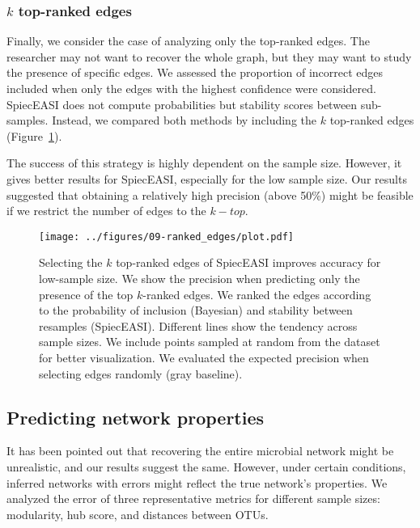 \documentclass[
  a4paper,
]{article}
\begin{document}
\hypertarget{k-top-ranked-edges}{%
\subsubsection{\texorpdfstring{\(k\) top-ranked
edges}{k top-ranked edges}}\label{k-top-ranked-edges}}

Finally, we consider the case of analyzing only the top-ranked edges.
The researcher may not want to recover the whole graph, but they may
want to study the presence of specific edges. We assessed the proportion
of incorrect edges included when only the edges with the highest
confidence were considered. SpiecEASI does not compute probabilities but
stability scores between sub-samples. Instead, we compared both methods
by including the \(k\) top-ranked edges (Figure~\ref{fig-ranked}).

The success of this strategy is highly dependent on the sample size.
However, it gives better results for SpiecEASI, especially for the low
sample size. Our results suggested that obtaining a relatively high
precision (above 50\%) might be feasible if we restrict the number of
edges to the \(k-top\).

\begin{figure}

{\centering \texttt{[image: ../figures/09-ranked\_edges/plot.pdf]}

}

\caption{\label{fig-ranked}Selecting the \(k\) top-ranked edges of
SpiecEASI improves accuracy for low-sample size. We show the precision
when predicting only the presence of the top \(k\)-ranked edges. We
ranked the edges according to the probability of inclusion (Bayesian)
and stability between resamples (SpiecEASI). Different lines show the
tendency across sample sizes. We include points sampled at random from
the dataset for better visualization. We evaluated the expected
precision when selecting edges randomly (gray baseline).}

\end{figure}

\hypertarget{predicting-network-properties}{%
\subsection{Predicting network
properties}\label{predicting-network-properties}}

It has been pointed out that recovering the entire microbial network
might be unrealistic, and our results suggest the same. However, under
certain conditions, inferred networks with errors might reflect the true
network's properties. We analyzed the error of three representative
metrics for different sample sizes: modularity, hub score, and distances
between OTUs.
\end{document}
